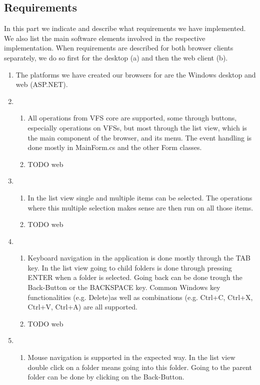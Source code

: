 \documentclass[a4paper,12pt]{article}
\begin{document}
\subsection{Requirements}
In this part we indicate and describe what requirements we have implemented. We also list the main software elements involved in the respective implementation. When requirements are described for both browser clients separately, we do so first for the desktop (a) and then the web client (b).

\begin{enumerate}
	\item The platforms we have created our browsers for are the Windows desktop and web (ASP.NET).
	\item
		\begin{enumerate} [label={(\alph*)}]
		\item All operations from VFS core are supported, some through buttons, especially operations on VFSs, but most through the list view, which is the main component of the browser, and its menu. The event handling is done mostly in MainForm.cs and the other Form classes.
		\item TODO web
		\end{enumerate}
	\item
		\begin{enumerate} [label={(\alph*)}]
		\item In the list view single and multiple items can be selected. The operations where this multiple selection makes sense are then run on all those items.
		\item TODO web
		\end{enumerate}
	\item
		\begin{enumerate} [label={(\alph*)}]
		\item Keyboard navigation in the application is done mostly through the TAB key. In the list view going to child folders is done through pressing ENTER when a folder is selected. Going back can be done trough the Back-Button or the BACKSPACE key. Common Windows key functionalities (e.g. Delete)as well as combinations (e.g. Ctrl+C, Ctrl+X, Ctrl+V, Ctrl+A) are all supported.
		\item TODO web
		\end{enumerate}
	\item
		\begin{enumerate} [label={(\alph*)}]
		\item Mouse navigation is supported in the expected way. In the list view double click on a folder means going into this folder. Going to the parent folder can be done by clicking on the Back-Button.

\end{enumerate}
\end{enumerate}
\end{document}
